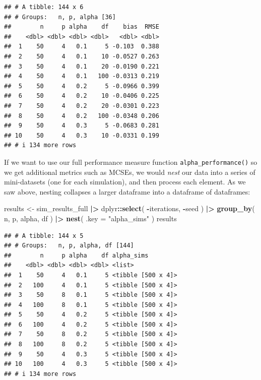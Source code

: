 \documentclass[
]{book}
\newenvironment{Shaded}{\begin{snugshade}}{\end{snugshade}}
\newcommand{\AttributeTok}[1]{\textcolor[rgb]{0.13,0.29,0.53}{#1}}
\newcommand{\FunctionTok}[1]{\textcolor[rgb]{0.13,0.29,0.53}{\textbf{#1}}}
\newcommand{\NormalTok}[1]{#1}
\newcommand{\OtherTok}[1]{\textcolor[rgb]{0.56,0.35,0.01}{#1}}
\newcommand{\SpecialCharTok}[1]{\textcolor[rgb]{0.81,0.36,0.00}{\textbf{#1}}}
\newcommand{\StringTok}[1]{\textcolor[rgb]{0.31,0.60,0.02}{#1}}
\begin{document}
\begin{verbatim}
## # A tibble: 144 x 6
## # Groups:   n, p, alpha [36]
##        n     p alpha    df    bias  RMSE
##    <dbl> <dbl> <dbl> <dbl>   <dbl> <dbl>
##  1    50     4   0.1     5 -0.103  0.388
##  2    50     4   0.1    10 -0.0527 0.263
##  3    50     4   0.1    20 -0.0190 0.221
##  4    50     4   0.1   100 -0.0313 0.219
##  5    50     4   0.2     5 -0.0966 0.399
##  6    50     4   0.2    10 -0.0406 0.225
##  7    50     4   0.2    20 -0.0301 0.223
##  8    50     4   0.2   100 -0.0348 0.206
##  9    50     4   0.3     5 -0.0683 0.281
## 10    50     4   0.3    10 -0.0331 0.199
## # i 134 more rows
\end{verbatim}

If we want to use our full performance measure function \texttt{alpha\_performance()} so we get additional metrics such as MCSEs, we would \emph{nest} our data into a series of mini-datasets (one for each simulation), and then process each element.
As we saw above, nesting collapses a larger dataframe into a dataframe of dataframes:

\begin{Shaded}
\begin{Highlighting}[]
\NormalTok{results }\OtherTok{\textless{}{-}}\NormalTok{ sim\_results\_full }\SpecialCharTok{|\textgreater{}}
\NormalTok{  dplyr}\SpecialCharTok{::}\FunctionTok{select}\NormalTok{( }\SpecialCharTok{{-}}\NormalTok{iterations, }\SpecialCharTok{{-}}\NormalTok{seed ) }\SpecialCharTok{|\textgreater{}}
  \FunctionTok{group\_by}\NormalTok{( n, p, alpha, df ) }\SpecialCharTok{|\textgreater{}}
  \FunctionTok{nest}\NormalTok{( }\AttributeTok{.key =} \StringTok{"alpha\_sims"}\NormalTok{ )}
\NormalTok{results}
\end{Highlighting}
\end{Shaded}

\begin{verbatim}
## # A tibble: 144 x 5
## # Groups:   n, p, alpha, df [144]
##        n     p alpha    df alpha_sims        
##    <dbl> <dbl> <dbl> <dbl> <list>            
##  1    50     4   0.1     5 <tibble [500 x 4]>
##  2   100     4   0.1     5 <tibble [500 x 4]>
##  3    50     8   0.1     5 <tibble [500 x 4]>
##  4   100     8   0.1     5 <tibble [500 x 4]>
##  5    50     4   0.2     5 <tibble [500 x 4]>
##  6   100     4   0.2     5 <tibble [500 x 4]>
##  7    50     8   0.2     5 <tibble [500 x 4]>
##  8   100     8   0.2     5 <tibble [500 x 4]>
##  9    50     4   0.3     5 <tibble [500 x 4]>
## 10   100     4   0.3     5 <tibble [500 x 4]>
## # i 134 more rows
\end{verbatim}
\end{document}
